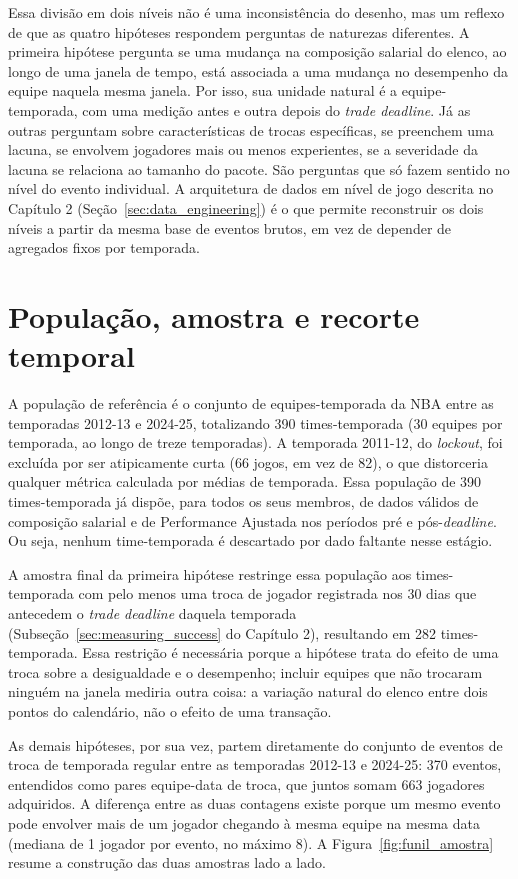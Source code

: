 Essa divisão em dois níveis não é uma inconsistência do desenho, mas um reflexo de que as quatro hipóteses respondem perguntas de naturezas diferentes. A primeira hipótese pergunta se uma mudança na composição salarial do elenco, ao longo de uma janela de tempo, está associada a uma mudança no desempenho da equipe naquela mesma janela. Por isso, sua unidade natural é a equipe-temporada, com uma medição antes e outra depois do \textit{trade deadline}. Já as outras perguntam sobre características de trocas específicas, se preenchem uma lacuna, se envolvem jogadores mais ou menos experientes, se a severidade da lacuna se relaciona ao tamanho do pacote. São perguntas que só fazem sentido no nível do evento individual. A arquitetura de dados em nível de jogo descrita no Capítulo 2 (Seção~\ref{sec:data_engineering}) é o que permite reconstruir os dois níveis a partir da mesma base de eventos brutos, em vez de depender de agregados fixos por temporada.

\section{População, amostra e recorte temporal}
\label{sec:sample}

A população de referência é o conjunto de equipes-temporada da NBA entre as temporadas 2012-13 e 2024-25, totalizando 390 times-temporada (30 equipes por temporada, ao longo de treze temporadas). A temporada 2011-12, do \textit{lockout}, foi excluída por ser atipicamente curta (66 jogos, em vez de 82), o que distorceria qualquer métrica calculada por médias de temporada. Essa população de 390 times-temporada já dispõe, para todos os seus membros, de dados válidos de composição salarial e de Performance Ajustada nos períodos pré e pós-\textit{deadline}. Ou seja, nenhum time-temporada é descartado por dado faltante nesse estágio.

A amostra final da primeira hipótese restringe essa população aos times-temporada com pelo menos uma troca de jogador registrada nos 30 dias que antecedem o \textit{trade deadline} daquela temporada (Subseção~\ref{sec:measuring_success} do Capítulo 2), resultando em 282 times-temporada. Essa restrição é necessária porque a hipótese trata do efeito de uma troca sobre a desigualdade e o desempenho; incluir equipes que não trocaram ninguém na janela mediria outra coisa: a variação natural do elenco entre dois pontos do calendário, não o efeito de uma transação.

As demais hipóteses, por sua vez, partem diretamente do conjunto de eventos de troca de temporada regular entre as temporadas 2012-13 e 2024-25: 370 eventos, entendidos como pares equipe-data de troca, que juntos somam 663 jogadores adquiridos. A diferença entre as duas contagens existe porque um mesmo evento pode envolver mais de um jogador chegando à mesma equipe na mesma data (mediana de 1 jogador por evento, no máximo 8). A Figura~\ref{fig:funil_amostra} resume a construção das duas amostras lado a lado.

